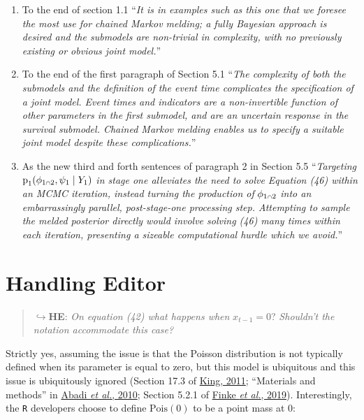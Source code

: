 \documentclass[
  10pt,
  a4paper,
]{article}
\providecommand{\tightlist}{%
  \setlength{\itemsep}{0pt}\setlength{\parskip}{0pt}}
\let\Oldcap\cap
\renewcommand{\cap}{\mathrel{\mathsmaller{\Oldcap}}}
\newcommand{\pd}{\text{p}}
\begin{document}
\begin{enumerate}
\def\labelenumi{\arabic{enumi}.}
\tightlist
\item
  To the end of section 1.1 ``\emph{It is in examples such as this one
  that we foresee the most use for chained Markov melding; a fully
  Bayesian approach is desired and the submodels are non-trivial in
  complexity, with no previously existing or obvious joint model.}''
\item
  To the end of the first paragraph of Section 5.1 ``\emph{The
  complexity of both the submodels and the definition of the event time
  complicates the specification of a joint model. Event times and
  indicators are a non-invertible function of other parameters in the
  first submodel, and are an uncertain response in the survival
  submodel. Chained Markov melding enables us to specify a suitable
  joint model despite these complications.}''
\item
  As the new third and forth sentences of paragraph 2 in Section 5.5
  ``\emph{Targeting} \(\pd_{1}(\phi_{1 \cap 2}, \psi_{1} \mid Y_{1})\)
  \emph{in stage one alleviates the need to solve Equation (46) within
  an MCMC iteration, instead turning the production of}
  \(\phi_{1 \cap 2}\) \emph{into an embarrassingly parallel,
  post-stage-one processing step. Attempting to sample the melded
  posterior directly would involve solving (46) many times within each
  iteration, presenting a sizeable computational hurdle which we
  avoid.}''
\end{enumerate}

\hypertarget{handling-editor}{%
\section*{Handling Editor}\label{handling-editor}}

\begin{quote}
\(\hookrightarrow\)\textbf{HE}: \emph{On equation (42) what happens
when} \(x_{t - 1} = 0\)? \emph{Shouldn't the notation accommodate this
case?}
\end{quote}

Strictly yes, assuming the issue is that the Poisson distribution is not
typically defined when its parameter is equal to zero, but this model is
ubiquitous and this issue is ubiquitously ignored (Section 17.3 of
\protect\hyperlink{ref-king_statistical_2011}{King, 2011}; ``Materials
and methods'' in \protect\hyperlink{ref-abadi_estimation_2010}{Abadi
\emph{et al.}, 2010}; Section 5.2.1 of
\protect\hyperlink{ref-finke_efficient_2019}{Finke \emph{et al.},
2019}). Interestingly, the \texttt{R} developers choose to define
\(\text{Pois}(0)\) to be a point mass at \(0\):
\end{document}
